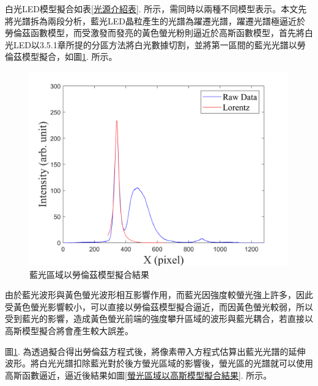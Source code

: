 白光LED模型擬合如表\ref{光源介紹表}. 所示，需同時以兩種不同模型表示。本文先將光譜拆為兩段分析，藍光LED晶粒產生的光譜為躍遷光譜，躍遷光譜極逼近於勞倫茲函數模型，而受激發而發亮的黃色螢光粉則逼近於高斯函數模型，首先將白光LED以3.5.1章所提的分區方法將白光數據切割，並將第一區間的藍光光譜以勞倫茲模型擬合，如圖\ref{藍光區域以勞倫茲模型擬合結果}. 所示。
\begin{figure}[H] %
	\centering %
	\includegraphics[width=16cm]{figures/white_lorentz.png} %
	\caption{藍光區域以勞倫茲模型擬合結果} %
	\label{藍光區域以勞倫茲模型擬合結果} %
\end{figure}
由於藍光波形與黃色螢光波形相互影響作用，而藍光因強度較螢光強上許多，因此受黃色螢光影響較小，可以直接以勞倫茲模型擬合逼近，而因黃色螢光較弱，所以受到藍光的影響，造成黃色螢光前端的強度攀升區域的波形與藍光耦合，若直接以高斯模型擬合將會產生較大誤差。\par
圖\ref{藍光區域以勞倫茲模型擬合結果}. 為透過擬合得出勞倫茲方程式後，將像素帶入方程式估算出藍光光譜的延伸波形。將白光光譜扣除藍光對於後方螢光區域的影響後，螢光區的光譜就可以使用高斯函數逼近，逼近後結果如圖\ref{螢光區域以高斯模型擬合結果}. 所示。
